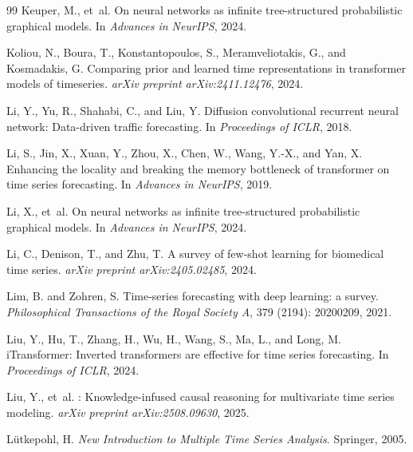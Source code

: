 \begin{thebibliography}{99}
Keuper, M., et~al.
\newblock On neural networks as infinite tree-structured probabilistic graphical models.
\newblock In \emph{Advances in NeurIPS}, 2024.

Koliou, N., Boura, T., Konstantopoulos, S., Meramveliotakis, G., and Kosmadakis, G.
\newblock Comparing prior and learned time representations in transformer models of timeseries.
\newblock \emph{arXiv preprint arXiv:2411.12476}, 2024.

Li, Y., Yu, R., Shahabi, C., and Liu, Y.
\newblock Diffusion convolutional recurrent neural network: Data-driven traffic forecasting.
\newblock In \emph{Proceedings of ICLR}, 2018.

Li, S., Jin, X., Xuan, Y., Zhou, X., Chen, W., Wang, Y.-X., and Yan, X.
\newblock Enhancing the locality and breaking the memory bottleneck of transformer on time series forecasting.
\newblock In \emph{Advances in NeurIPS}, 2019.

Li, X., et~al.
\newblock On neural networks as infinite tree-structured probabilistic graphical models.
\newblock In \emph{Advances in NeurIPS}, 2024.

Li, C., Denison, T., and Zhu, T.
\newblock A survey of few-shot learning for biomedical time series.
\newblock \emph{arXiv preprint arXiv:2405.02485}, 2024.

Lim, B. and Zohren, S.
\newblock Time-series forecasting with deep learning: a survey.
\newblock \emph{Philosophical Transactions of the Royal Society A}, 379 (2194): 20200209, 2021.

Liu, Y., Hu, T., Zhang, H., Wu, H., Wang, S., Ma, L., and Long, M.
\newblock i{T}ransformer: Inverted transformers are effective for time series forecasting.
\newblock In \emph{Proceedings of ICLR}, 2024.

Liu, Y., et~al.
: Knowledge-infused causal reasoning for multivariate time series modeling.
\newblock \emph{arXiv preprint arXiv:2508.09630}, 2025.

L{\"u}tkepohl, H.
\newblock \emph{New Introduction to Multiple Time Series Analysis}.
\newblock Springer, 2005.


\end{thebibliography}
